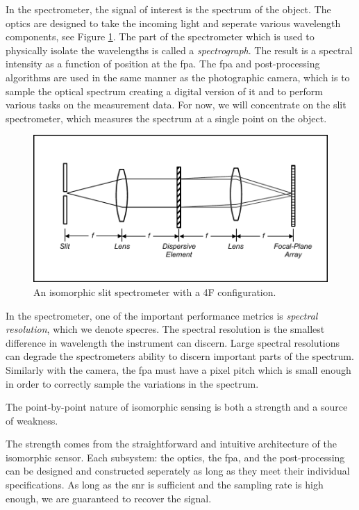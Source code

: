 In the spectrometer, the signal of interest is the spectrum of the object. The optics are designed to take the incoming light and seperate various wavelength components, see Figure \ref{fig:slitspectrometer}. The part of the spectrometer which is used to physically isolate the wavelengths is called a \emph{spectrograph}. The result is a spectral intensity as a function of position at the \gls{fpa}. The \gls{fpa} and post-processing algorithms are used in the same manner as the photographic camera, which is to sample the optical spectrum creating a digital version of it and to perform various tasks on the measurement data. For now, we will concentrate on the slit spectrometer, which measures the spectrum at a single point on the object.


\begin{figure}
    \centering
    \includegraphics[scale=1]{slitspectrometer}
    \caption{An isomorphic slit spectrometer with a 4F configuration.}
    \label{fig:slitspectrometer}
\end{figure}

In the spectrometer, one of the important performance metrics is \emph{spectral resolution}, which we denote \gls{specres}. The spectral resolution is the smallest difference in wavelength the instrument can discern. Large spectral resolutions can degrade the spectrometers ability to discern important parts of the spectrum. Similarly with the camera, the \gls{fpa} must have a pixel pitch which is small enough in order to correctly sample the variations in the spectrum. 

The point-by-point nature of isomorphic sensing is both a strength and a source of weakness. 

The strength comes from the straightforward and intuitive architecture of the isomorphic sensor. Each subsystem: the optics, the \acrfull{fpa}, and the post-processing can be designed and constructed seperately as long as they meet their individual specifications. As long as the \gls{snr} is sufficient and the sampling rate is high enough, we are guaranteed to recover the signal.

